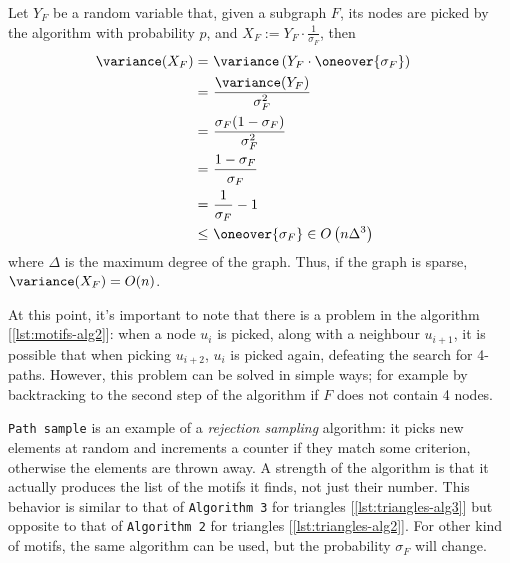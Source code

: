 Let $Y_F$ be a random variable that, given a subgraph $F$, its nodes are picked by the algorithm with probability $p$, and $X_F := Y_F \cdot \frac{1}{\sigma_F}$, then
\begin{align*}
          \variance(X_F)
       =&\ \variance \left( Y_F \cdot \oneover{\sigma_F} \right)    & \\
       =&\ \frac{\variance(Y_F)}{\sigma_F^2}                        & \\
       =&\ \frac{\sigma_F (1 - \sigma_F)}{\sigma_F^2}               & \\
       =&\ \frac{1 - \sigma_F}{\sigma_F}                            & \\
       =&\ \frac{1}{\sigma_F} - 1                                   & \\
    \leq&\ \oneover{\sigma_F} \in O\left(n\Delta^3\right)    &
\end{align*}
where $\Delta$ is the maximum degree of the graph. Thus, if the graph is sparse, $\variance(X_F) = O(n)$.

At this point, it's important to note that there is a problem in the algorithm [\ref{lst:motifs-alg2}]: when a node $u_i$ is picked, along with a neighbour $u_{i + 1}$, it is possible that when picking $u_{i + 2}$, $u_i$ is picked again, defeating the search for 4-paths. However, this problem can be solved in simple ways; for example by backtracking to the second step of the algorithm if $F$ does not contain 4 nodes.

\texttt{Path sample} is an example of a \emph{rejection sampling} algorithm: it picks new elements at random and increments a counter if they match some criterion, otherwise the elements are thrown away. A strength of the algorithm is that it actually produces the list of the motifs it finds, not just their number. This behavior is similar to that of \texttt{Algorithm 3} for triangles [\ref{lst:triangles-alg3}] but opposite to that of \texttt{Algorithm 2} for triangles [\ref{lst:triangles-alg2}].  For other kind of motifs, the same algorithm can be used, but the probability $\sigma_F$ will change.